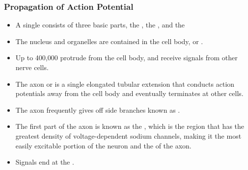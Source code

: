 \documentclass{article}
\numberwithin{equation}{section}
\begin{document}
\subsubsection{Propagation of Action Potential}
\begin{itemize}
    \item A single  consists of three basic parts, the , the , and the 
    \item The nucleus and organelles are contained in the cell body, or .
    \item Up to 400,000  protrude from the cell body, and receive signals from other nerve cells.
    \item The axon or  is a single elongated tubular extension that conducts action potentials away from the cell body and eventually terminates at other cells.
    \item The axon frequently gives off side branches known as .
    \item The first part of the axon is known as the , which is the region that has the greatest density of voltage-dependent sodium channels, making it the most easily excitable portion of the neuron and the  of the axon.
    \item Signals end at the .
\end{itemize}
\end{document}
